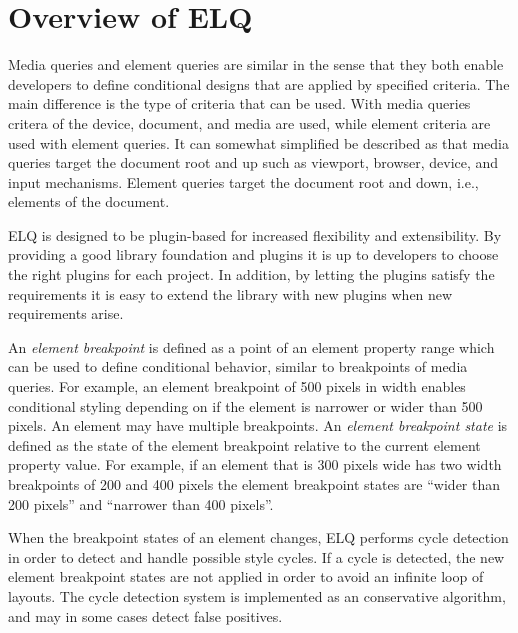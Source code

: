 \documentclass[]{llncs}
\newcommand{\elq}{ELQ}
\begin{document}
\section{Overview of \elq{}}\label{sec:elq}\label{sec:elq-api}
  Media queries and element queries are similar in the sense that they both enable developers to define conditional designs that are applied by specified criteria.
  The main difference is the type of criteria that can be used.
  With media queries critera of the device, document, and media are used, while element criteria are used with element queries.
  It can somewhat simplified be described as that media queries target the document root and up such as viewport, browser, device, and input mechanisms.
  Element queries target the document root and down, i.e., elements of the document.

  \elq{} is designed to be plugin-based for increased flexibility and extensibility.
  By providing a good library foundation and plugins it is up to developers to choose the right plugins for each project.
  In addition, by letting the plugins satisfy the requirements it is easy to extend the library with new plugins when new requirements arise.

  An \emph{element breakpoint} is defined as a point of an element property range which can be used to define conditional behavior, similar to breakpoints of media queries.
  For example, an element breakpoint of 500 pixels in width enables conditional styling depending on if the element is narrower or wider than 500 pixels.
  An element may have multiple breakpoints.
  An \emph{element breakpoint state} is defined as the state of the element breakpoint relative to the current element property value.
  For example, if an element that is 300 pixels wide has two width breakpoints of 200 and 400 pixels the element breakpoint states are ``wider than 200 pixels'' and ``narrower than 400 pixels''.

  When the breakpoint states of an element changes, \elq{} performs cycle detection in order to detect and handle possible style cycles.
  If a cycle is detected, the new element breakpoint states are not applied in order to avoid an infinite loop of layouts.
  The cycle detection system is implemented as an conservative algorithm, and may in some cases detect false positives.
\end{document}
